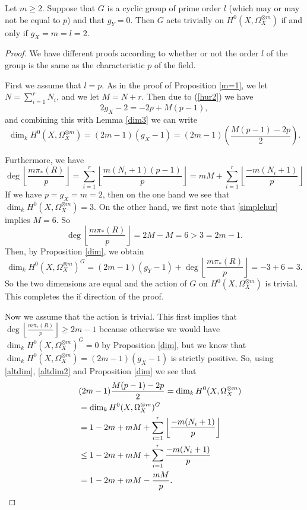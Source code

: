 \begin{prop}\label{triv}
Let $m \geq 2$. 
Suppose that $G$ is a cyclic group of prime order $l$ (which may or may not be equal to $p$) and that $g_Y=0$. 
Then $G$ acts trivially on $H^0(X,\Omega_X^{\otimes m})$ if and only if $g_X=m=l=2$.
\end{prop}
\begin{proof}

We have different proofs according to whether or not the order $l$ of the group is the same as the characteristic $p$ of the field.


First we assume that $l=p$. 
As in the proof of Proposition \ref{m=1}, we let $N=\sum_{i=1}^r N_i$, and we let $M=N+r$.
Then due to (\ref{hur2}) we have
\begin{equation}\label{simplehur}2g_X-2=-2p+M(p-1),\end{equation}
and combining this with Lemma \ref{dim3} we can write
\begin{equation}\label{altdim2}
\dim_kH^0(X,\Omega_X^{\otimes m})=(2m-1)(g_X-1)=(2m-1)\left(\frac{M(p-1)-2p}{2}\right).
\end{equation}

Furthermore, we have
\begin{equation}\label{altdim}
\deg\left\lfloor \frac{m\pi_*(R)}{p} \right\rfloor = \sum_{i=1}^r\left\lfloor \frac{m(N_i+1)(p-1)}{p} \right\rfloor  = mM + \sum_{i=1}^r\left\lfloor \frac{-m(N_i+1)}{p} \right\rfloor
\end{equation}
If we have $p=g_X=m=2$, then on the one hand we see that $\dim_kH^0(X,\Omega_X^{\otimes m}) =3$. 
On the other hand, we first note that \eqref{simplehur} implies $M=6$.
So $$\deg\left\lfloor \frac{m\pi_*(R)}{p}\right\rfloor = 2M -M =6 > 3 = 2m-1.$$
Then, by Proposition \ref{dim}, we obtain 
$$\dim_kH^0(X,\Omega_X^{\otimes m})^G = (2m-1)(g_Y-1)+\deg\left\lfloor \frac{m\pi_*(R)}{p} \right\rfloor = -3 + 6 = 3.$$
So the two dimensions are equal and the action of $G$ on $H^0(X,\Omega_X^{\otimes m})$ is trivial. 
This completes the if direction of the proof.

Now we assume that the action is trivial. This first implies that 
$\deg \left\lfloor\frac{m\pi_*(R)}{p}\right\rfloor \geq 2m-1$ because otherwise we would 
have $\dim_kH^0(X,\Omega_X^{\otimes m})^G=0$ by Proposition \ref{dim}, but we know that 
$\dim_kH^0(X,\Omega_X^{\otimes m})=(2m-1)(g_X-1)$ is strictly positive. 
So, using \eqref{altdim}, \eqref{altdim2} and Proposition \ref{dim} we see that
\begin{align}\label{bound}
\lefteqn{(2m-1)\frac{M(p-1)-2p}{2} = \dim_kH^0(X,\Omega_X^{\otimes m})} \nonumber\\
& =  \dim_kH^0(X,\Omega_X^{\otimes m})^G \nonumber\\
& =  1-2m+mM+\sum_{i=1}^r\left\lfloor\frac{-m(N_i+1)}{p}\right\rfloor\nonumber \\
& \leq  1-2m+mM+\sum_{i=1}^r\frac{-m(N_i+1)}{p}\nonumber \\
& =  1-2m+mM-\frac{mM}{p}.
\end{align}


\end{proof}
